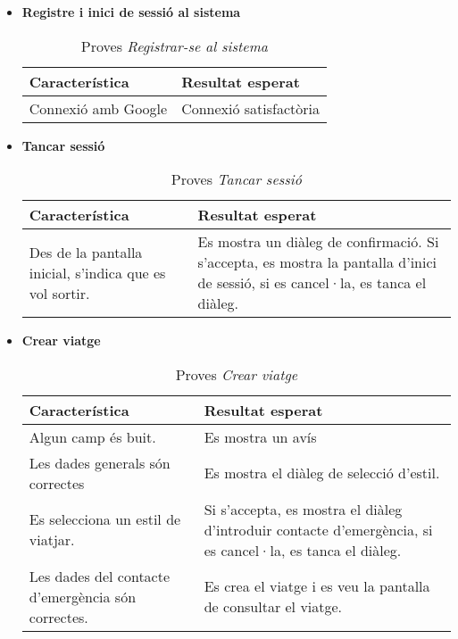 \begin{itemize}

\item{}\textbf{Registre i inici de sessió al sistema}

\begin{table}[!h]
\centering
\begin{tabular}{|T|T|}
\hline
\textbf{Característica} & \textbf{Resultat esperat} \\\hline
Connexió amb Google & Connexió satisfactòria\\\hline
\end{tabular}
\label{}
\caption{Proves \textit{Registrar-se al sistema}}
\end{table}

\item{}\textbf{Tancar sessió}

\begin{table}[!h]
\centering
\begin{tabular}{|T|T|}
\hline
\textbf{Característica} & \textbf{Resultat esperat} \\\hline
Des de la pantalla inicial, s'indica que es vol sortir. & Es mostra un diàleg de confirmació. Si s'accepta, es mostra la pantalla d'inici de sessió, si es cancel·la, es tanca el diàleg.\\\hline
\end{tabular}
\label{}
\caption{Proves \textit{Tancar sessió}}
\end{table}

\item{}\textbf{Crear viatge}

\begin{table}[!h]
\centering
\begin{tabular}{|T|T|}
\hline
\textbf{Característica} & \textbf{Resultat esperat} \\\hline
Algun camp és buit. & Es mostra un avís\\\hline
Les dades generals són correctes & Es mostra el diàleg de selecció d'estil.\\\hline
Es selecciona un estil de viatjar. & Si s'accepta, es mostra el diàleg d'introduir contacte d'emergència, si es cancel·la, es tanca el diàleg.\\\hline
Les dades del contacte d'emergència són correctes. & Es crea el viatge i es veu la pantalla de consultar el viatge.\\\hline
\end{tabular}
\label{}
\caption{Proves \textit{Crear viatge}}
\end{table}


\end{itemize}
